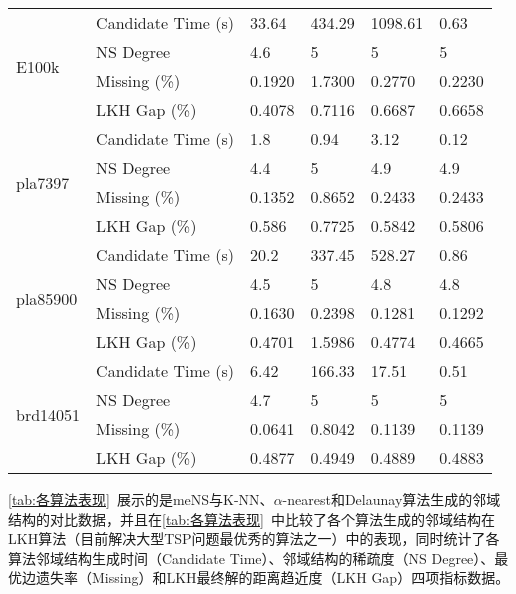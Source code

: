 \begin{longtable}[c]{llllll}
    \midrule
    \multirow{4}[2]{*}{E100k}  & Candidate Time (s) & 33.64 & 434.29 & 1098.61 & 0.63 \\
                & NS Degree       & 4.6    & 5    & 5       & 5      \\
                & Missing (\%)               & 0.1920  & 1.7300 & 0.2770  & 0.2230  \\
                & LKH Gap (\%)           & 0.4078 & 0.7116 & 0.6687  & 0.6658 \\
    \midrule
    \multirow{4}[2]{*}{pla7397}  & Candidate Time (s) & 1.8   & 0.94  & 3.12   & 0.12  \\
                & NS Degree       & 4.4    & 5    & 4.9     & 4.9    \\
                & Missing (\%)               & 0.1352  & 0.8652 & 0.2433  & 0.2433  \\
                & LKH Gap (\%)           & 0.586  & 0.7725 & 0.5842  & 0.5806 \\
    \midrule
    \multirow{4}[2]{*}{pla85900} & Candidate Time (s) & 20.2 & 337.45 & 528.27 & 0.86 \\
                & NS Degree       & 4.5    & 5      & 4.8     & 4.8    \\
                & Missing (\%)               & 0.1630  & 0.2398 & 0.1281  & 0.1292  \\
                & LKH Gap (\%)           & 0.4701 & 1.5986 & 0.4774  & 0.4665 \\
    \midrule
    \multirow{4}[2]{*}{brd14051} & Candidate Time (s) & 6.42  & 166.33  & 17.51  & 0.51   \\
                & NS Degree       & 4.7    & 5      & 5       & 5      \\
                & Missing (\%)               & 0.0641  & 0.8042 & 0.1139  & 0.1139  \\
                & LKH Gap (\%)           & 0.4877 & 0.4949 & 0.4889  & 0.4883 \\
    \bottomrule
\end{longtable}
\par
\autoref{tab:各算法表现}~展示的是meNS与K-NN、$\alpha$-nearest和Delaunay算法生成的邻域结构的对比数据，并且在\autoref{tab:各算法表现}~中比较了各个算法生成的邻域结构在LKH算法\cite{helsgaun2000effective}（目前解决大型TSP问题最优秀的算法之一）中的表现，同时统计了各算法邻域结构生成时间（Candidate Time）、邻域结构的稀疏度（NS Degree）、最优边遗失率（Missing）和LKH最终解的距离趋近度（LKH Gap）四项指标数据。
\par
